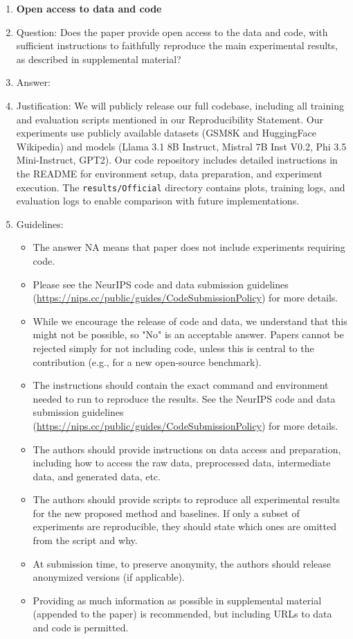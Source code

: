 \documentclass{article}
\begin{document}
\begin{enumerate}
\item {\bf Open access to data and code}
    \item[] Question: Does the paper provide open access to the data and code, with sufficient instructions to faithfully reproduce the main experimental results, as described in supplemental material?
    \item[] Answer: \answerYes{} %
    \item[] Justification: We will publicly release our full codebase, including all training and evaluation scripts mentioned in our Reproducibility Statement. Our experiments use publicly available datasets (GSM8K and HuggingFace Wikipedia) and models (Llama 3.1 8B Instruct, Mistral 7B Inst V0.2, Phi 3.5 Mini-Instruct, GPT2). Our code repository includes detailed instructions in the README for environment setup, data preparation, and experiment execution. The \texttt{results/Official} directory contains plots, training logs, and evaluation logs to enable comparison with future implementations.
    \item[] Guidelines:
    \begin{itemize}
        \item The answer NA means that paper does not include experiments requiring code.
        \item Please see the NeurIPS code and data submission guidelines (\url{https://nips.cc/public/guides/CodeSubmissionPolicy}) for more details.
        \item While we encourage the release of code and data, we understand that this might not be possible, so "No" is an acceptable answer. Papers cannot be rejected simply for not including code, unless this is central to the contribution (e.g., for a new open-source benchmark).
        \item The instructions should contain the exact command and environment needed to run to reproduce the results. See the NeurIPS code and data submission guidelines (\url{https://nips.cc/public/guides/CodeSubmissionPolicy}) for more details.
        \item The authors should provide instructions on data access and preparation, including how to access the raw data, preprocessed data, intermediate data, and generated data, etc.
        \item The authors should provide scripts to reproduce all experimental results for the new proposed method and baselines. If only a subset of experiments are reproducible, they should state which ones are omitted from the script and why.
        \item At submission time, to preserve anonymity, the authors should release anonymized versions (if applicable).
        \item Providing as much information as possible in supplemental material (appended to the paper) is recommended, but including URLs to data and code is permitted.
    \end{itemize}



\end{enumerate}
\end{document}
